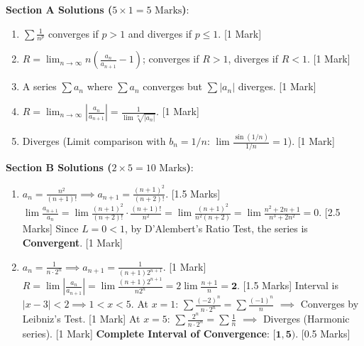 \begin{solutionbox}
\noindent\textbf{Section A Solutions ($5 \times 1 = 5\text{ Marks}$)}:
\begin{enumerate}
    \item $\sum \frac{1}{n^p}$ converges if $p > 1$ and diverges if $p \le 1$. [1 Mark]
    \item $R = \lim_{n\to\infty} n\left(\frac{a_n}{a_{n+1}}-1\right)$; converges if $R > 1$, diverges if $R < 1$. [1 Mark]
    \item A series $\sum a_n$ where $\sum a_n$ converges but $\sum |a_n|$ diverges. [1 Mark]
    \item $R = \lim_{n\to\infty} \left|\frac{a_n}{a_{n+1}}\right| = \frac{1}{\lim \sqrt[n]{|a_n|}}$. [1 Mark]
    \item Diverges (Limit comparison with $b_n = 1/n$: $\lim \frac{\sin(1/n)}{1/n} = 1$). [1 Mark]
\end{enumerate}

\medskip
\noindent\textbf{Section B Solutions ($2 \times 5 = 10\text{ Marks}$)}:
\begin{enumerate}[start=6]
    \item $a_n = \frac{n^2}{(n+1)!} \implies a_{n+1} = \frac{(n+1)^2}{(n+2)!}$. [1.5 Marks]
    $\lim \frac{a_{n+1}}{a_n} = \lim \frac{(n+1)^2}{(n+2)!} \cdot \frac{(n+1)!}{n^2} = \lim \frac{(n+1)^2}{n^2 (n+2)} = \lim \frac{n^2+2n+1}{n^3+2n^2} = 0$. [2.5 Marks]
    Since $L = 0 < 1$, by D'Alembert's Ratio Test, the series is \textbf{Convergent}. [1 Mark]

    \item $a_n = \frac{1}{n \cdot 2^n} \implies a_{n+1} = \frac{1}{(n+1)2^{n+1}}$. [1 Mark]
    $R = \lim \left|\frac{a_n}{a_{n+1}}\right| = \lim \frac{(n+1)2^{n+1}}{n 2^n} = 2 \lim \frac{n+1}{n} = \mathbf{2}$. [1.5 Marks]
    Interval is $|x-3| < 2 \implies 1 < x < 5$.
    At $x = 1$: $\sum \frac{(-2)^n}{n \cdot 2^n} = \sum \frac{(-1)^n}{n}$ $\implies$ Converges by Leibniz's Test. [1 Mark]
    At $x = 5$: $\sum \frac{2^n}{n \cdot 2^n} = \sum \frac{1}{n}$ $\implies$ Diverges (Harmonic series). [1 Mark]
    \textbf{Complete Interval of Convergence}: $\mathbf{[1, 5)}$. [0.5 Marks]
\end{enumerate}


\end{solutionbox}
